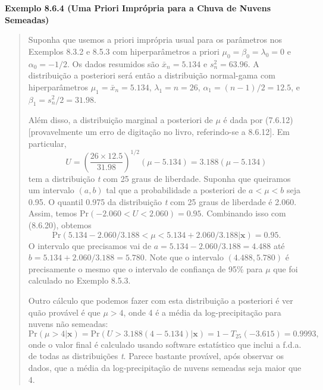 \vspace{1em}
\noindent\textbf{Exemplo 8.6.4 (Uma Priori Imprópria para a Chuva de Nuvens Semeadas)}
\begin{quote}
    Suponha que usemos a priori imprópria usual para os parâmetros nos Exemplos 8.3.2 e 8.5.3 com hiperparâmetros a priori $\mu_0 = \beta_0 = \lambda_0 = 0$ e $\alpha_0 = -1/2$. Os dados resumidos são $\bar{x}_n = 5.134$ e $s_n^2 = 63.96$. A distribuição a posteriori será então a distribuição normal-gama com hiperparâmetros $\mu_1 = \bar{x}_n = 5.134$, $\lambda_1 = n = 26$, $\alpha_1 = (n-1)/2 = 12.5$, e $\beta_1 = s_n^2/2 = 31.98$.
    
    Além disso, a distribuição marginal a posteriori de $\mu$ é dada por (7.6.12) [provavelmente um erro de digitação no livro, referindo-se a 8.6.12]. Em particular,
    \begin{equation} \label{eq:8.6.20}
        U = \left(\frac{26 \times 12.5}{31.98}\right)^{1/2}(\mu - 5.134) = 3.188(\mu - 5.134)
    \end{equation}
    tem a distribuição \textit{t} com 25 graus de liberdade. Suponha que queiramos um intervalo $(a, b)$ tal que a probabilidade a posteriori de $a < \mu < b$ seja 0.95. O quantil 0.975 da distribuição \textit{t} com 25 graus de liberdade é 2.060. Assim, temos $\text{Pr}(-2.060 < U < 2.060) = 0.95$. Combinando isso com (8.6.20), obtemos
    \[
    \text{Pr}(5.134 - 2.060/3.188 < \mu < 5.134 + 2.060/3.188|\mathbf{x}) = 0.95.
    \]
    O intervalo que precisamos vai de $a = 5.134 - 2.060/3.188 = 4.488$ até $b = 5.134 + 2.060/3.188 = 5.780$. Note que o intervalo $(4.488, 5.780)$ é precisamente o mesmo que o intervalo de confiança de 95\% para $\mu$ que foi calculado no Exemplo 8.5.3.

    Outro cálculo que podemos fazer com esta distribuição a posteriori é ver quão provável é que $\mu > 4$, onde 4 é a média da log-precipitação para nuvens não semeadas:
    \[
    \text{Pr}(\mu > 4|\mathbf{x}) = \text{Pr}(U > 3.188(4 - 5.134)|\mathbf{x}) = 1 - T_{25}(-3.615) = 0.9993,
    \]
    onde o valor final é calculado usando software estatístico que inclui a f.d.a. de todas as distribuições \textit{t}. Parece bastante provável, após observar os dados, que a média da log-precipitação de nuvens semeadas seja maior que 4.
\end{quote}
\vspace{1em}

